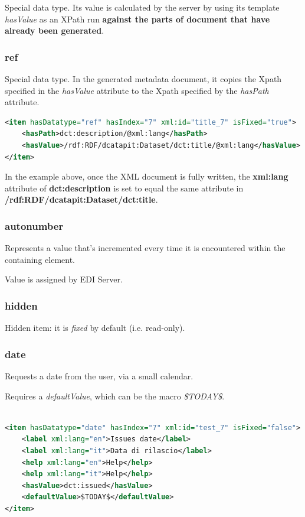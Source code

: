 \documentclass[10pt]{article}
\begin{document}
Special data type.
Its value is calculated by the server by using its template \textit{hasValue} as an XPath run \textbf{against the parts of document that have already been generated}.

\subsubsection{ref}
\label{ref}

Special data type.
In the generated metadata document, it copies the Xpath specified in the \textit{hasValue} attribute to the Xpath specified by the \textit{hasPath} attribute.

\begin{lstlisting}[language=xml]
<item hasDatatype="ref" hasIndex="7" xml:id="title_7" isFixed="true">
	<hasPath>dct:description/@xml:lang</hasPath>
	<hasValue>/rdf:RDF/dcatapit:Dataset/dct:title/@xml:lang</hasValue>
</item>
\end{lstlisting}

In the example above, once the XML document is fully written, the \textbf{xml:lang} attribute of \textbf{dct:description} is set to equal the same attribute in \textbf{/rdf:RDF/dcatapit:Dataset/dct:title}.

\subsubsection{autonumber}
\label{autonumber}

Represents a value that's incremented every time it is encountered within the containing element.

Value is assigned by EDI Server.

\subsubsection{hidden}
\label{hidden}

Hidden item: it is \textit{fixed} by default (i.e. read-only).

\subsubsection{date}
\label{date}

Requests a date from the user, via a small calendar.

Requires a \textit{defaultValue}, which can be the macro \textit{\$TODAY\$}.

\begin{lstlisting}[language=xml]

<item hasDatatype="date" hasIndex="7" xml:id="test_7" isFixed="false">
	<label xml:lang="en">Issues date</label>
	<label xml:lang="it">Data di rilascio</label>
	<help xml:lang="en">Help</help>
	<help xml:lang="it">Help</help>
	<hasValue>dct:issued</hasValue>
	<defaultValue>$TODAY$</defaultValue>
</item>

\end{lstlisting}
\end{document}
